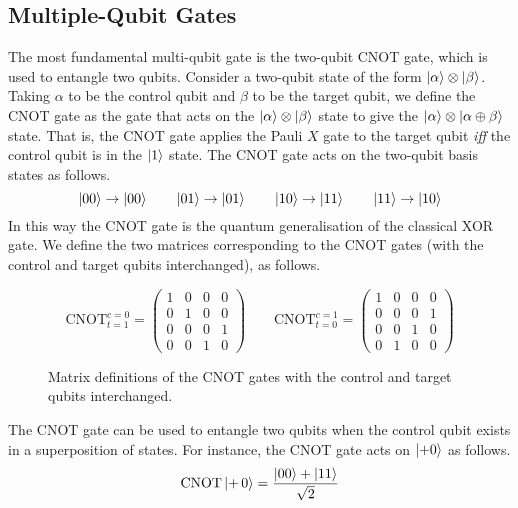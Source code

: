 \subsection{Multiple-Qubit Gates}

The most fundamental multi-qubit gate is the two-qubit CNOT gate, which is used to entangle two qubits. Consider a two-qubit state of the form $\ket \alpha \otimes \ket \beta$. Taking $\alpha$ to be the control qubit and $\beta$ to be the target qubit, we define the CNOT gate as the gate that acts on the $\ket\alpha\otimes\ket\beta$ state to give the $\ket\alpha\otimes\ket{\alpha\oplus\beta}$ state. That is, the CNOT gate applies the Pauli $X$ gate to the target qubit \textit{iff} the control qubit is in the $\ket 1$ state. The CNOT gate acts on the two-qubit basis states as follows.
\begin{equation*}
    \ket{00} \rightarrow \ket {00} \qquad
    \ket{01} \rightarrow \ket {01} \qquad
    \ket{10} \rightarrow \ket {11} \qquad
    \ket{11} \rightarrow \ket {10}
\end{equation*}
In this way the CNOT gate is the quantum generalisation of the classical XOR gate. We define the two matrices corresponding to the CNOT gates (with the control and target qubits interchanged), as follows.

\begin{figure}[H]
    \centering
    \begin{equation*}
    \text{CNOT}^{c=0}_{t=1} =
        \begin{pmatrix}
            1 & 0 & 0 & 0 \\
            0 & 1 & 0 & 0 \\
            0 & 0 & 0 & 1 \\
            0 & 0 & 1 & 0
        \end{pmatrix} \qquad
        \text{CNOT}^{c=1}_{t=0} =
        \begin{pmatrix}
            1 & 0 & 0 & 0 \\
            0 & 0 & 0 & 1 \\
            0 & 0 & 1 & 0 \\
            0 & 1 & 0 & 0
        \end{pmatrix}
    \end{equation*}
    \caption{Matrix definitions of the CNOT gates with the control and target qubits interchanged.}
\end{figure}

The CNOT gate can be used to entangle two qubits when the control qubit exists in a superposition of states. For instance, the CNOT gate acts on $\ket{+0}$ as follows.
\begin{equation*}
    \text{CNOT} \ket{+ \, 0} = \frac{\ket{00} + \ket{11}}{\sqrt 2}
\end{equation*}

